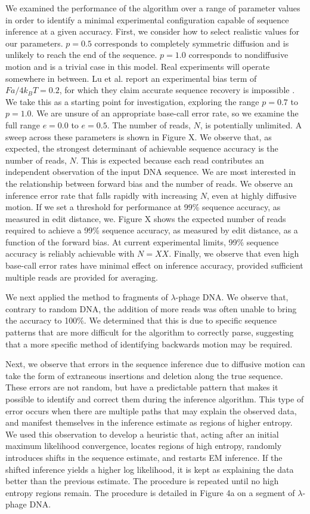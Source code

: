 \documentclass{biophys_letter}
\begin{document}
\begin{multicols}{2}
We examined the performance of the algorithm over a range of parameter values in order to identify a minimal experimental configuration capable of sequence inference at a given accuracy.
First, we consider how to select realistic values for our parameters.
$p=0.5$ corresponds to completely symmetric diffusion and is unlikely to reach the end of the sequence.
$p=1.0$ corresponds to nondiffusive motion and is a trivial case in this model.
Real experiments will operate somewhere in between.
Lu et al. report an experimental bias term of $Fa/4k_{B}T=0.2$, for which they claim accurate sequence recovery is impossible \cite{Lu:2011}.
We take this as a starting point for investigation, exploring the range $p=0.7$ to $p=1.0$.
We are unsure of an appropriate base-call error rate, so we examine the full range $e=0.0$ to $e=0.5$.
The number of reads, $N$, is potentially unlimited.
A sweep across these parameters is shown in Figure X.
We observe that, as expected, the strongest determinant of achievable sequence accuracy is the number of reads, $N$.
This is expected because each read contributes an independent observation of the input DNA sequence.
We are most interested in the relationship between forward bias and the number of reads.
We observe an inference error rate that falls rapidly with increasing $N$, even at highly diffusive motion. 
If we set a threshold for performance at 99\% sequence accuracy, as measured in edit distance, we.
Figure X shows the expected number of reads required to achieve a 99\% sequence accuracy, as measured by edit distance, as a function of the forward bias.
At current experimental limits, 99\% sequence accuracy is reliably achievable with $N=XX$.
Finally, we observe that even high base-call error rates have minimal effect on inference accuracy, provided sufficient multiple reads are provided for averaging.

We next applied the method to fragments of $\lambda$-phage DNA.
We observe that, contrary to random DNA, the addition of more reads was often unable to bring the accuracy to 100\%.
We determined that this is due to specific sequence patterns that are more difficult for the algorithm to correctly parse, suggesting that a more specific method of identifying backwards motion may be required.

Next, we observe that errors in the sequence inference due to diffusive motion can take the form of extraneous insertions and deletion along the true sequence.
These errors are not random, but have a predictable pattern that makes it possible to identify and correct them during the inference algorithm.
This type of error occurs when there are multiple paths that may explain the observed data, and manifest themselves in the inference estimate as regions of higher entropy.
We used this observation to develop a heuristic that, acting after an initial maximum likelihood convergence, locates regions of high entropy, randomly introduces shifts in the sequence estimate, and restarts EM inference.
If the shifted inference yields a higher log likelihood, it is kept as explaining the data better than the previous estimate.
The procedure is repeated until no high entropy regions remain.
The procedure is detailed in Figure 4a on a segment of $\lambda$-phage DNA.


\end{multicols}
\end{document}
